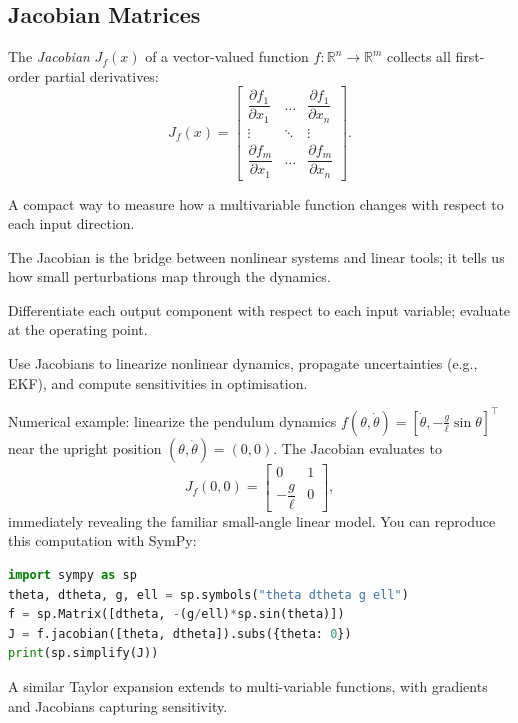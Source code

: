 \subsection{Jacobian Matrices}
The \emph{Jacobian} $J_f(x)$ of a vector-valued function $f:\mathbb{R}^n \rightarrow \mathbb{R}^m$ collects all first-order partial derivatives:
\[
    J_f(x) = \begin{bmatrix}
        \dfrac{\partial f_1}{\partial x_1} & \dots & \dfrac{\partial f_1}{\partial x_n} \\
        \vdots & \ddots & \vdots \\
        \dfrac{\partial f_m}{\partial x_1} & \dots & \dfrac{\partial f_m}{\partial x_n}
    \end{bmatrix}.
\]
\begin{description}[leftmargin=2.5em, style=nextline]
    \item[\textbf{What?}] A compact way to measure how a multivariable function changes with respect to each input direction.
    \item[\textbf{Why?}] The Jacobian is the bridge between nonlinear systems and linear tools; it tells us how small perturbations map through the dynamics.
    \item[\textbf{How?}] Differentiate each output component with respect to each input variable; evaluate at the operating point.
    \item[\textbf{When?}] Use Jacobians to linearize nonlinear dynamics, propagate uncertainties (e.g., EKF), and compute sensitivities in optimisation.
\end{description}
Numerical example: linearize the pendulum dynamics $f(\theta,\dot{\theta}) = [\dot{\theta}, -\frac{g}{\ell} \sin\theta]^{\top}$ near the upright position $(\theta, \dot{\theta}) = (0,0)$. The Jacobian evaluates to
\[
    J_f(0,0) =
    \begin{bmatrix}
        0 & 1 \\
        -\dfrac{g}{\ell} & 0
    \end{bmatrix},
\]
immediately revealing the familiar small-angle linear model.
You can reproduce this computation with SymPy:
\begin{lstlisting}[language=python]
import sympy as sp
theta, dtheta, g, ell = sp.symbols("theta dtheta g ell")
f = sp.Matrix([dtheta, -(g/ell)*sp.sin(theta)])
J = f.jacobian([theta, dtheta]).subs({theta: 0})
print(sp.simplify(J))
\end{lstlisting}

A similar Taylor expansion extends to multi-variable functions, with gradients and Jacobians capturing sensitivity.

